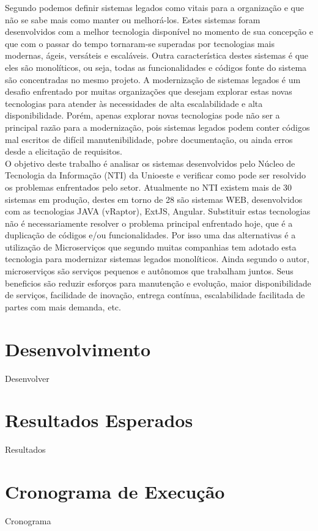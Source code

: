 \documentclass[12pt]{article}
\begin{document}
Segundo \cite{Bennett} podemos definir sistemas legados como vitais para a organização e que não se sabe mais como manter ou melhorá-los. Estes sistemas foram desenvolvidos com a melhor tecnologia disponível no momento de sua concepção e que com o passar do tempo tornaram-se superadas por tecnologias mais modernas, ágeis, versáteis e escaláveis. Outra característica destes sistemas é que eles são monolíticos, ou seja, todas as funcionalidades e códigos fonte do sistema são concentradas no mesmo projeto. A modernização de sistemas legados é um desafio enfrentado por muitas organizações que desejam explorar estas novas tecnologias para atender às necessidades de alta escalabilidade e alta disponibilidade\cite{Furda2018}. Porém, apenas explorar novas tecnologias pode não ser a principal razão para a modernização, pois sistemas legados podem conter códigos mal escritos de difícil manutenibilidade, pobre documentação, ou ainda erros desde a elicitação de requisitos.  \\
O objetivo deste trabalho é analisar os sistemas desenvolvidos pelo Núcleo de Tecnologia da Informação (NTI) da Unioeste e verificar como pode ser resolvido os problemas enfrentados pelo setor. Atualmente no NTI existem mais de 30 sistemas em produção, destes em torno de 28 são sistemas WEB, desenvolvidos com as tecnologias JAVA (vRaptor), ExtJS, Angular. Substituir estas tecnologias não é necessariamente resolver o problema principal enfrentado hoje, que é a duplicação de códigos e/ou funcionalidades. Por isso uma das alternativas é a utilização de Microserviços que segundo \cite{Carvalho2019} muitas companhias tem adotado esta tecnologia  para modernizar sistemas legados monolíticos. Ainda segundo o autor, microserviços são serviços pequenos e autônomos que trabalham juntos. Seus beneficios são reduzir esforços para manutenção e evolução, maior disponibilidade de serviços, facilidade de inovação, entrega contínua, escalabilidade facilitada de partes com mais demanda, etc.




\section{Desenvolvimento} \label{sec:firstpage}

Desenvolver

\section{Resultados Esperados}

Resultados

\section{Cronograma de Execução}

Cronograma





\end{document}
